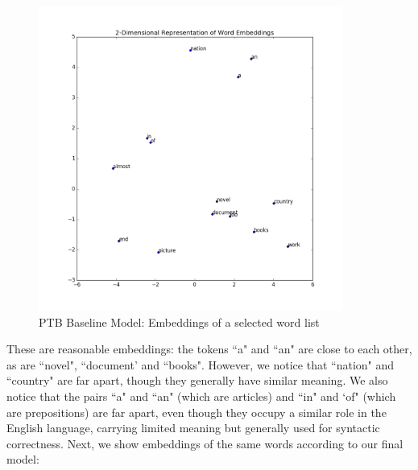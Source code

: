 \documentclass[a4paper]{article}
\begin{document}
\begin{figure}[H]
  \includegraphics[width=10cm]{../plots/PTB_baseline_word_list_embeddings.png}
  \centering
  \caption{PTB Baseline Model: Embeddings of a selected word list}
  \label{fig:ptb1}
\end{figure}
These are reasonable embeddings: the tokens ``a" and ``an" are close to each other, as are ``novel", ``document' and ``books". However, we notice that ``nation" and ``country" are far apart, though they generally have similar meaning. We also notice that the pairs ``a" and ``an" (which are articles) and ``in" and `of" (which are prepositions) are far apart, even though they occupy a similar role in the English language, carrying limited meaning but generally used for syntactic correctness.
\newline
\newline
Next, we show embeddings of the same words according to our final model:
\end{document}
